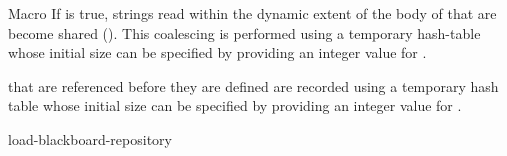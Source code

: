 \documentclass[10pt,twoside,english,pdftex]{article}
\begin{document}
\begin{functiondoc}{Macro}
If  is true, strings read within the dynamic
extent of the body of  that are  become
shared ().  This coalescing is performed using a temporary hash-table
whose initial size can be specified by providing an integer value for
.

 that are referenced before they are defined are
recorded using a temporary hash table whose initial size can be specified by
providing an integer value for .

\begin{alsos}{load-blackboard-repository}
\end{alsos}

\end{functiondoc}

\end{document}
